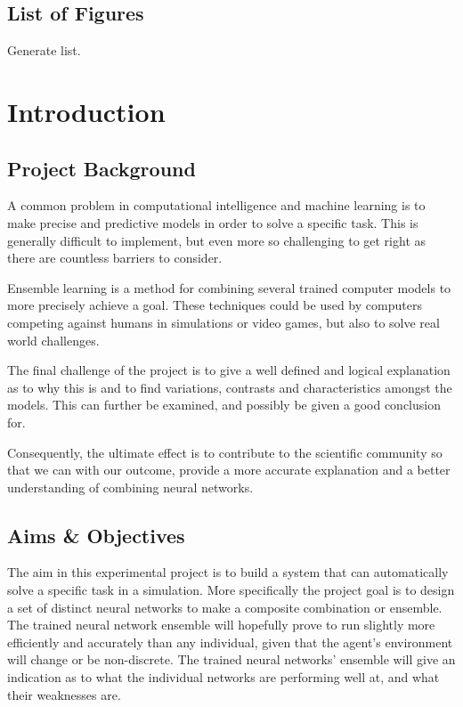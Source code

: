 \documentclass[
a4paper,
11pt,
english
]{report}
\begin{document}
\section{List of Figures}
Generate list.
\clearpage


\chapter{Introduction}

\section{Project Background}
A common problem in computational intelligence and machine learning is to make precise and predictive models in order to solve a specific task. This is generally difficult to implement, but even more so challenging to get right as there are countless barriers to consider.

Ensemble learning is a method for combining several trained computer models to more precisely achieve a goal. These techniques could be used by computers competing against humans in simulations or video games, but also to solve real world challenges.

The final challenge of the project is to give a well defined and logical explanation as to why this is and to find variations, contrasts and characteristics amongst the models. This can further be examined, and possibly be given a good conclusion for.

Consequently, the ultimate effect is to contribute to the scientific community so that we can with our outcome, provide a more accurate explanation and a better understanding of combining neural networks.

\section{Aims \& Objectives}
The aim in this experimental project is to build a system that can automatically solve a specific task in a simulation. More specifically the project goal is to design a set of distinct neural networks to make a composite combination or ensemble. The trained neural network ensemble will hopefully prove to run slightly more efficiently and accurately than any individual, given that the agent's environment will change or be non-discrete. The trained neural networks' ensemble will give an indication as to what the individual networks are performing well at, and what their weaknesses are.
\end{document}
